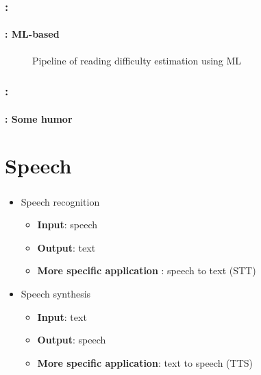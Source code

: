 \documentclass[xcolor=table]{beamer}
\begin{document}
\begin{frame}
	\frametitle{\insertshortsubtitle: \insertsection}
	\framesubtitle{\insertsubsection: ML-based}
	
	\begin{figure}
		\centering
		\caption{Pipeline of reading difficulty estimation using ML \cite{2014-collins}}
	\end{figure}
	
\end{frame}

\begin{frame}
	\frametitle{\insertshortsubtitle: \insertsection}
	\framesubtitle{\insertsubsection: Some humor}
	
	\begin{center}
	\end{center}
	
\end{frame}

\section{Speech}

\begin{frame}
	\frametitle{\insertshortsubtitle}
	\framesubtitle{\insertsection}
	
	\begin{itemize}
		\item Speech recognition
		\begin{itemize}
			\item \textbf{Input}: speech
			\item \textbf{Output}: text
			\item \textbf{More specific application} : speech to text (STT)
		\end{itemize}
		\item Speech synthesis
		\begin{itemize}
			\item \textbf{Input}: text
			\item \textbf{Output}: speech
			\item \textbf{More specific application}: text to speech (TTS)
		\end{itemize}
	\end{itemize}

\end{frame}
\end{document}

